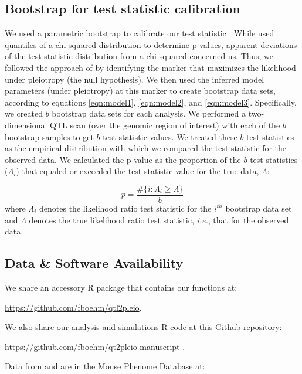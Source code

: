 \documentclass[12pt,twoside, lineno]{gsajnl}
\begin{document}
\subsection{Bootstrap for test statistic calibration}

We used a parametric bootstrap to calibrate our test statistic \citep{efron1979}. While \citet{jiang1995multiple} used quantiles of a chi-squared distribution to determine p-values, apparent deviations of the test statistic distribution from a chi-squared concerned us. Thus, we followed the approach of \citet{tian2016dissection} by identifying the marker that maximizes the likelihood under pleiotropy (the null hypothesis). We then used the inferred model parameters (under pleiotropy) at this marker to create bootstrap data sets, according to equations \ref{eqn:model1}, \ref{eqn:model2}, and \ref{eqn:model3}. Specifically, we created $b$ bootstrap data sets for each analysis. We performed a two-dimensional QTL scan (over the genomic region of interest) with each of the $b$ bootstrap samples to get $b$ test statistic values. We treated these $b$ test statistics as the empirical distribution with which we compared the test statistic for the observed data. We calculated the p-value as the proportion of the $b$ test statistics ($\Lambda_i$) that equaled or exceeded the test statistic value for the true data, $\Lambda$:

\begin{equation}
p = \frac{\# \lbrace i:\Lambda_i \geq \Lambda\rbrace}{b}
\end{equation}
where $\Lambda_{i}$ denotes the likelihood ratio test statistic for the $i^{th}$ bootstrap data set and $\Lambda$ denotes the true likelihood ratio test statistic, \textit{i.e.}, that for the observed data. 

\subsection{Data \& Software Availability}


We share an accessory R package that contains our functions at:

\href{https://github.com/fboehm/qtl2pleio}{https://github.com/fboehm/qtl2pleio}. 

\noindent We also share our analysis and simulations R code at this Github repository:

\href{https://github.com/fboehm/qt2pleio-manuscript}{https://github.com/fboehm/qt2pleio-manuscript} \citep{r}.

\noindent Data from \citet{recla2014precise} and \citet{logan2013high} are in the Mouse Phenome Database at:
\end{document}

